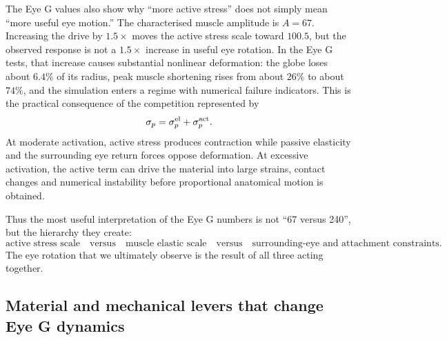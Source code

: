 \documentclass[11pt]{article}
\begin{document}
The Eye G values also show why ``more active stress'' does not simply mean ``more useful eye motion.'' The characterised muscle amplitude is $A=67$. Increasing the drive by $1.5\times$ moves the active stress scale toward $100.5$, but the observed response is not a $1.5\times$ increase in useful eye rotation. In the Eye G tests, that increase causes substantial nonlinear deformation: the globe loses about $6.4\%$ of its radius, peak muscle shortening rises from about $26\%$ to about $74\%$, and the simulation enters a regime with numerical failure indicators. This is the practical consequence of the competition represented by
\begin{equation}
\sigma_p=\sigma_p^{\rm el}+\sigma_p^{\rm act}.
\label{eq:stress-competition}
\end{equation}
At moderate activation, active stress produces contraction while passive elasticity and the surrounding eye return forces oppose deformation. At excessive activation, the active term can drive the material into large strains, contact changes and numerical instability before proportional anatomical motion is obtained.

Thus the most useful interpretation of the Eye G numbers is not ``67 versus 240'', but the hierarchy they create:
\begin{equation}
\text{active stress scale}
\quad\text{versus}\quad
\text{muscle elastic scale}
\quad\text{versus}\quad
\text{surrounding-eye and attachment constraints}.
\label{eq:mechanical-hierarchy}
\end{equation}
The eye rotation that we ultimately observe is the result of all three acting together.

\subsection*{Material and mechanical levers that change Eye G dynamics}
\end{document}
